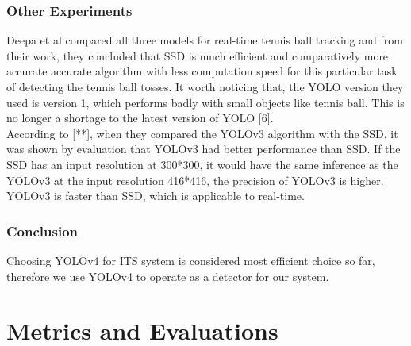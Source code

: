         \subsubsection{Other Experiments}
            Deepa et al compared all three models for real-time tennis ball tracking and from their work, they concluded that SSD is much efficient and comparatively more accurate accurate algorithm with less computation speed for this particular task of detecting the tennis ball tosses. It worth noticing that, the YOLO version they used is version 1, which performs badly with small objects like tennis ball. This is no longer a shortage to the latest version of YOLO [6]. \\ 
            \vspace{3mm}
            According to [**], when they compared the YOLOv3 algorithm with the SSD, it was shown by evaluation that YOLOv3 had better performance than SSD. If the SSD has an input resolution at 300*300, it would have the same inference as the YOLOv3 at the input resolution 416*416, the precision of YOLOv3 is higher. YOLOv3 is faster than SSD, which is applicable to real-time. \\ 
        
        \subsubsection{Conclusion}
            Choosing YOLOv4 for ITS system is considered most efficient choice so far, therefore we use YOLOv4 to operate as a detector for our system.
\section{Metrics and Evaluations}

